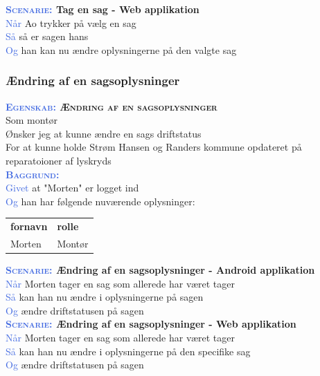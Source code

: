 \textbf{\textsc{\textcolor{RoyalBlue}{Scenarie:}} Tag en sag - Web applikation}\\
\textcolor{RoyalBlue}{Når} Ao trykker på vælg en sag\\
\textcolor{RoyalBlue}{Så} så er sagen hans\\
\textcolor{RoyalBlue}{Og} han kan nu ændre oplysningerne på den valgte sag\\

\subsubsection{Ændring af en sagsoplysninger}\label{sec:USRedigerSag}
\textbf{\textsc{\textcolor{RoyalBlue}{Egenskab:} Ændring af en sagsoplysninger}}\\
Som montør\\
Ønsker jeg at kunne ændre en sags driftstatus\\
For at kunne holde Strøm Hansen og Randers kommune opdateret på reparatoioner af lyskryds\\

\textsc{\textcolor{RoyalBlue}{\textbf{Baggrund:}}}\\
\textcolor{RoyalBlue}{Givet} at "Morten" er logget ind\\
\textcolor{RoyalBlue}{Og} han har følgende nuværende oplysninger:\\
\begin{tabular}{| l | l |}
	\textbf{fornavn} & \textbf{rolle} \\
	Morten & Montør\\
\end{tabular}
\newline \newline


\textbf{\textsc{\textcolor{RoyalBlue}{Scenarie:}} Ændring af en sagsoplysninger - Android applikation}\\
\textcolor{RoyalBlue}{Når} Morten tager en sag som allerede har været tager\\
\textcolor{RoyalBlue}{Så} kan han nu ændre i oplysningerne på sagen\\
\textcolor{RoyalBlue}{Og} ændre driftstatusen på sagen\\

\textbf{\textsc{\textcolor{RoyalBlue}{Scenarie:}} Ændring af en sagsoplysninger - Web applikation}\\
\textcolor{RoyalBlue}{Når} Morten tager en sag som allerede har været tager\\
\textcolor{RoyalBlue}{Så} kan han nu ændre i oplysningerne på den specifike sag\\
\textcolor{RoyalBlue}{Og} ændre driftstatusen på sagen\\

